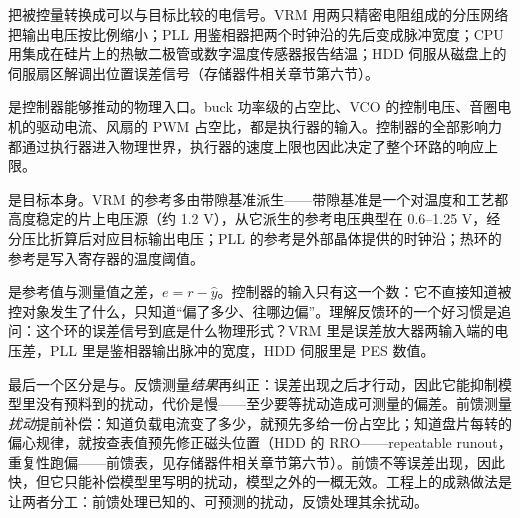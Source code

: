 把被控量转换成可以与目标比较的电信号。VRM 用两只精密电阻组成的分压网络把输出电压按比例缩小；PLL 用鉴相器把两个时钟沿的先后变成脉冲宽度；CPU 用集成在硅片上的热敏二极管或数字温度传感器报告结温；HDD 伺服从磁盘上的伺服扇区解调出位置误差信号（存储器件相关章节第六节）。

是控制器能够推动的物理入口。buck 功率级的占空比、VCO 的控制电压、音圈电机的驱动电流、风扇的 PWM 占空比，都是执行器的输入。控制器的全部影响力都通过执行器进入物理世界，执行器的速度上限也因此决定了整个环路的响应上限。

是目标本身。VRM 的参考多由带隙基准派生——带隙基准是一个对温度和工艺都高度稳定的片上电压源（约 1.2 V），从它派生的参考电压典型在 0.6--1.25 V，经分压比折算后对应目标输出电压；PLL 的参考是外部晶体提供的时钟沿；热环的参考是写入寄存器的温度阈值。

是参考值与测量值之差，$e = r - \hat{y}$。控制器的输入只有这一个数：它不直接知道被控对象发生了什么，只知道“偏了多少、往哪边偏”。理解反馈环的一个好习惯是追问：这个环的误差信号到底是什么物理形式？VRM 里是误差放大器两输入端的电压差，PLL 里是鉴相器输出脉冲的宽度，HDD 伺服里是 PES 数值。

最后一个区分是与。反馈测量\emph{结果}再纠正：误差出现之后才行动，因此它能抑制模型里没有预料到的扰动，代价是慢——至少要等扰动造成可测量的偏差。前馈测量\emph{扰动}提前补偿：知道负载电流变了多少，就预先多给一份占空比；知道盘片每转的偏心规律，就按查表值预先修正磁头位置（HDD 的 RRO——repeatable runout，重复性跑偏——前馈表，见存储器件相关章节第六节）。前馈不等误差出现，因此快，但它只能补偿模型里写明的扰动，模型之外的一概无效。工程上的成熟做法是让两者分工：前馈处理已知的、可预测的扰动，反馈处理其余扰动。

